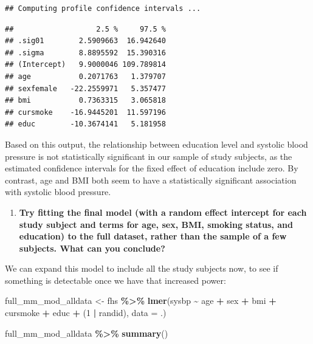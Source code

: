 \documentclass[
]{book}
\newenvironment{Shaded}{\begin{snugshade}}{\end{snugshade}}
\newcommand{\AttributeTok}[1]{\textcolor[rgb]{0.13,0.29,0.53}{#1}}
\newcommand{\DecValTok}[1]{\textcolor[rgb]{0.00,0.00,0.81}{#1}}
\newcommand{\FunctionTok}[1]{\textcolor[rgb]{0.13,0.29,0.53}{\textbf{#1}}}
\newcommand{\NormalTok}[1]{#1}
\newcommand{\OtherTok}[1]{\textcolor[rgb]{0.56,0.35,0.01}{#1}}
\newcommand{\SpecialCharTok}[1]{\textcolor[rgb]{0.81,0.36,0.00}{\textbf{#1}}}
\providecommand{\tightlist}{%
  \setlength{\itemsep}{0pt}\setlength{\parskip}{0pt}}
\begin{document}
\begin{verbatim}
## Computing profile confidence intervals ...
\end{verbatim}

\begin{verbatim}
##                   2.5 %     97.5 %
## .sig01        2.5909663  16.942640
## .sigma        8.8895592  15.390316
## (Intercept)   9.9000046 109.789814
## age           0.2071763   1.379707
## sexfemale   -22.2559971   5.357477
## bmi           0.7363315   3.065818
## cursmoke    -16.9445201  11.597196
## educ        -10.3674141   5.181958
\end{verbatim}

Based on this output, the relationship between education level and systolic
blood pressure is not statistically significant in our sample of study subjects,
as the estimated confidence intervals for the fixed effect of education include
zero. By contrast, age and BMI both seem to have a statistically significant
association with systolic blood pressure.

\begin{enumerate}
\def\labelenumi{\arabic{enumi}.}
\setcounter{enumi}{3}
\tightlist
\item
  \textbf{Try fitting the final model (with a random effect intercept for each study
  subject and terms for age, sex, BMI, smoking status, and education) to the
  full dataset, rather than the sample of a few subjects. What can you conclude?}
\end{enumerate}

We can expand this model to include all the study subjects now, to see if
something is detectable once we have that increased power:

\begin{Shaded}
\begin{Highlighting}[]
\NormalTok{full\_mm\_mod\_alldata }\OtherTok{\textless{}{-}}\NormalTok{ fhs }\SpecialCharTok{\%\textgreater{}\%} 
  \FunctionTok{lmer}\NormalTok{(sysbp }\SpecialCharTok{\textasciitilde{}}\NormalTok{ age }\SpecialCharTok{+}\NormalTok{ sex }\SpecialCharTok{+}\NormalTok{ bmi }\SpecialCharTok{+}\NormalTok{ cursmoke }\SpecialCharTok{+}\NormalTok{ educ }\SpecialCharTok{+}\NormalTok{ (}\DecValTok{1} \SpecialCharTok{|}\NormalTok{ randid), }
       \AttributeTok{data =}\NormalTok{ .) }

\NormalTok{full\_mm\_mod\_alldata }\SpecialCharTok{\%\textgreater{}\%} 
  \FunctionTok{summary}\NormalTok{()}
\end{Highlighting}
\end{Shaded}
\end{document}
